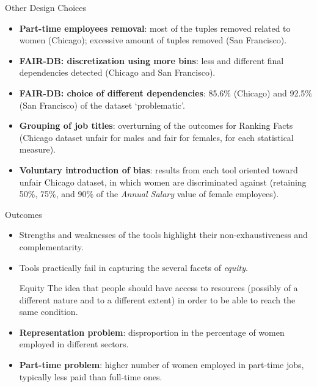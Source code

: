 \documentclass[usenames,dvipsnames]{beamer}
\begin{document}
    
    \begin{frame}{Other Design Choices}
        \begin{itemize}
            \item \textbf{Part-time employees removal}: most of the tuples removed related to women (Chicago); excessive amount of tuples removed (San Francisco).
            \item \textbf{FAIR-DB: discretization using more bins}: less and different final dependencies detected (Chicago and San Francisco).
            \item \textbf{FAIR-DB: choice of different dependencies}: 85.6\% (Chicago) and 92.5\% (San Francisco) of the dataset `problematic'.
            \item \textbf{Grouping of job titles}: overturning of the outcomes for Ranking Facts (Chicago dataset unfair for males and fair for females, for each statistical measure).
            \item \textbf{Voluntary introduction of bias}: results from each tool oriented toward unfair Chicago dataset, in which women are discriminated against (retaining 50\%, 75\%, and 90\% of the \textit{Annual Salary} value of female employees).
        \end{itemize}
    \end{frame}
    
    
    \begin{frame}{Outcomes}
        \begin{itemize}
            \item Strengths and weaknesses of the tools highlight their non-exhaustiveness and complementarity.
            \item Tools practically fail in capturing the several facets of \textit{equity}.
            \begin{block}{Equity}
                The idea that people should have access to resources (possibly of a different nature and to a different extent) in order to be able to reach the same condition.
            \end{block}
            \item \textbf{Representation problem}: disproportion in the percentage of women employed in different sectors.
            \item \textbf{Part-time problem}: higher number of women employed in part-time jobs, typically less paid than full-time ones.
        \end{itemize}
    \end{frame}
    
\end{document}
